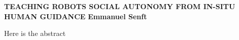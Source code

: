 \textbf{TEACHING ROBOTS SOCIAL AUTONOMY FROM IN-SITU HUMAN GUIDANCE}\newline
\textbf{Emmanuel Senft}

Here is the abstract
